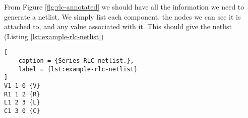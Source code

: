 \documentclass{article}
\begin{document}
From Figure \ref{fig:rlc-annotated} we should have all the information we need to generate a netlist. We simply list each component, the nodes we can see it is attached to, and any value associated with it. This should give the netlist (Listing \ref{lst:example-rlc-netlist})

\begin{lstlisting}[
    caption = {Series RLC netlist.},
    label = {lst:example-rlc-netlist}
]
V1 1 0 {V}
R1 1 2 {R}
L1 2 3 {L}
C1 3 0 {C}
\end{lstlisting}

\pagebreak
{}
\printbibliography
\end{document}
